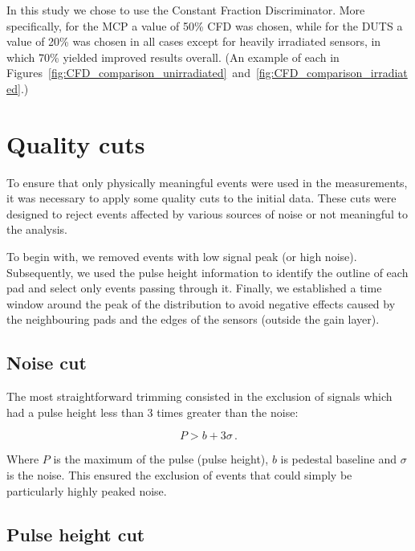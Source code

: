 In this study we chose to use the Constant Fraction Discriminator. More specifically, for the MCP a value of 50\% CFD was chosen, while for the DUTS a value of 20\% was chosen in all cases except for heavily irradiated sensors, in which 70\% yielded improved results overall. (An example of each in Figures~\ref{fig:CFD_comparison_unirradiated}~and~\ref{fig:CFD_comparison_irradiated}.)

\FloatBarrier

\section{Quality cuts}\label{sec:qualtiy_cuts}

To ensure that only physically meaningful events were used in the measurements, it was necessary to apply some quality cuts to the initial data. These cuts were designed to reject events affected by various sources of noise or not meaningful to the analysis. 

To begin with, we removed events with low signal peak (or high noise). Subsequently, we used the pulse height information to identify the outline of each pad and select only events passing through it. Finally, we established a time window around the peak of the distribution to avoid negative effects caused by the neighbouring pads and the edges of the sensors (outside the gain layer).

\subsection{Noise cut}\label{subsec:noise_cut}
The most straightforward trimming consisted in the exclusion of signals which had a pulse height less than 3 times greater than the noise:

\begin{equation*}
    P > b + 3\sigma \, .
\end{equation*}

Where \(P\) is the maximum of the pulse (pulse height), \(b\) is pedestal baseline and \(\sigma\) is the noise. This ensured the exclusion of events that could simply be particularly highly peaked noise. %

\subsection{Pulse height cut}\label{subsec:pulseHeight_cut}

